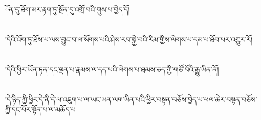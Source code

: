ོན་དུ་ཐོག་མར་རྟག་ཏུ་སྔོན་དུ་འགྲོ་བའི་གུས་པ་བྱེད་དོ།\chapter{ }།དེའི་འོག་ཏུ་ཐོས་པ་ལས་བྱུང་བ་ལ་སོགས་པའི་ཤེས་རབ་སྐྱེ་བའི་རིམ་གྱིས་ལེགས་པ་དམ་པ་ཐོབ་པར་འགྱུར་རོ།\chapter{ }།དེའི་ཕྱིར་ཡོན་ཏན་དང་ལྡན་པ་རྣམས་ལ་དད་པའི་ལེགས་པ་ཐམས་ཅད་ཀྱི་གཙོ་བོའི་རྒྱུ་ཡིན་ནོ།\chapter{ }།དེ་ཉིད་ཀྱི་ཕྱིར་དེ་ནི་དེ་ལ་འཇུག་པ་ལ་ཡང་ཡན་ལག་ཡིན་པའི་ཕྱིར་བསྟན་བཅོས་བྱེད་པ་ཕལ་ཆེར་བསྟན་བཅོས་ཀྱི་དང་པོར་སྟོན་པ་ལ་མཆོད་པ